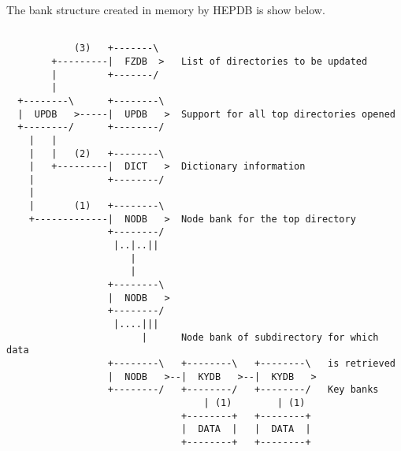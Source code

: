 The bank structure created in memory by HEPDB is show below.
\begin{verbatim}

            (3)   +-------\
        +---------|  FZDB  >   List of directories to be updated
        |         +-------/
        |
  +--------\      +--------\
  |  UPDB   >-----|  UPDB   >  Support for all top directories opened
  +--------/      +--------/
    |   |
    |   |   (2)   +--------\
    |   +---------|  DICT   >  Dictionary information
    |             +--------/
    |
    |       (1)   +--------\
    +-------------|  NODB   >  Node bank for the top directory
                  +--------/
                   |..|..||
                      |
                      |
                  +--------\
                  |  NODB   >
                  +--------/
                   |....|||
                        |      Node bank of subdirectory for which data
                  +--------\   +--------\   +--------\   is retrieved
                  |  NODB   >--|  KYDB   >--|  KYDB   >
                  +--------/   +--------/   +--------/   Key banks
                                   | (1)        | (1)
                               +--------+   +--------+
                               |  DATA  |   |  DATA  |
                               +--------+   +--------+


\end{verbatim}

